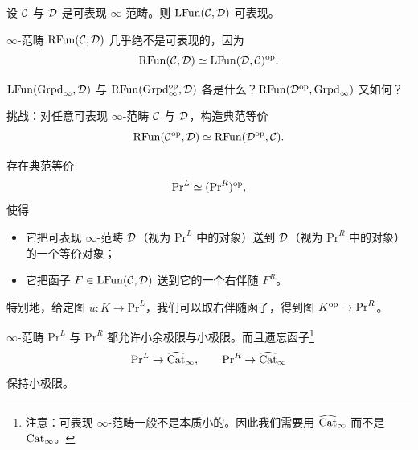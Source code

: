 \begin{proposition}[HTT.5.5.3.8]\label{L13-5.2}
设 $\mathcal{C}$ 与 $\mathcal{D}$ 是可表现 $\infty$-范畴。则 $\mathrm{LFun}(\mathcal{C},\mathcal{D})$ 可表现。
\end{proposition}

\begin{warning}\label{L13-5.3}
$\infty$-范畴 $\mathrm{RFun}(\mathcal{C},\mathcal{D})$ 几乎绝不是可表现的，因为
\[
\mathrm{RFun}(\mathcal{C},\mathcal{D})\simeq\mathrm{LFun}(\mathcal{D},\mathcal{C})^{\mathrm{op}}.
\]
\end{warning}

\begin{exercise}\label{L13-5.4}
$\mathrm{LFun}(\operatorname{Grpd}_\infty,\mathcal{D})$ 与 $\mathrm{RFun}(\operatorname{Grpd}^{\mathrm{op}}_\infty,\mathcal{D})$ 各是什么？$\mathrm{RFun}(\mathcal{D}^{\mathrm{op}},\operatorname{Grpd}_\infty)$ 又如何？
\end{exercise}

\begin{exercise}\label{L13-5.5}
挑战：对任意可表现 $\infty$-范畴 $\mathcal{C}$ 与 $\mathcal{D}$，构造典范等价
\[
\mathrm{RFun}(\mathcal{C}^{\mathrm{op}},\mathcal{D})\simeq\mathrm{RFun}(\mathcal{D}^{\mathrm{op}},\mathcal{C}).
\]
\end{exercise}

\begin{theorem}[HTT.5.5.3.4]\label{L13-5.6}
存在典范等价
\[
\mathrm{Pr}^{L}\simeq(\mathrm{Pr}^{R})^{\mathrm{op}},
\]
使得
\begin{itemize}[leftmargin=2.2em,itemsep=0.1em]
\item 它把可表现 $\infty$-范畴 $\mathcal{D}$（视为 $\mathrm{Pr}^{L}$ 中的对象）送到 $\mathcal{D}$（视为 $\mathrm{Pr}^{R}$ 中的对象）的一个等价对象；
\item 它把函子 $F\in\mathrm{LFun}(\mathcal{C},\mathcal{D})$ 送到它的一个右伴随 $F^{R}$。
\end{itemize}
\end{theorem}

\begin{remark}\label{L13-5.7}
特别地，给定图 $u\colon K\to\mathrm{Pr}^{L}$，我们可以取右伴随函子，得到图 $K^{\mathrm{op}}\to\mathrm{Pr}^{R}$。
\end{remark}

\begin{theorem}[HTT.5.5.3.13, 5.5.3.18]\label{L13-5.8}
$\infty$-范畴 $\mathrm{Pr}^{L}$ 与 $\mathrm{Pr}^{R}$ 都允许小余极限与小极限。而且遗忘函子\footnote{注意：可表现 $\infty$-范畴一般不是本质小的。因此我们需要用 $\widehat{\operatorname{Cat}}_\infty$ 而不是 $\operatorname{Cat}_\infty$。}
\[
\mathrm{Pr}^{L}\to\widehat{\operatorname{Cat}}_\infty,\qquad \mathrm{Pr}^{R}\to\widehat{\operatorname{Cat}}_\infty
\]
保持小极限。
\end{theorem}

